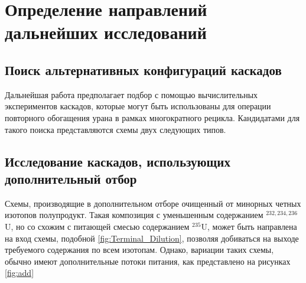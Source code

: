 \section{Определение направлений дальнейших исследований}

\subsection{Поиск альтернативных конфигураций каскадов}
Дальнейшая работа предполагает подбор с помощью вычислительных экспериментов каскадов, которые могут быть использованы для операции повторного обогащения урана в рамках многократного рецикла. Кандидатами для такого поиска представляются схемы двух следующих типов.

\subsection{Исследование каскадов, использующих дополнительный отбор}
Схемы, производящие в дополнительном отборе очищенный от минорных четных изотопов полупродукт. Такая композиция с уменьшенным содержанием $^{232,234,236}$U, но со схожим с питающей смесью содержанием $^{235}$U, может быть направлена на вход схемы, подобной \ref{fig:Terminal_Dilution}, позволяя добиваться на выходе требуемого содержания по всем изотопам. Однако,  вариации таких схемы, обычно имеют дополнительные потоки питания, как представлено на рисунках \ref{fig:add}

